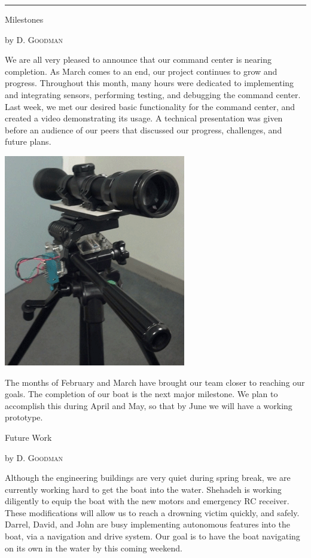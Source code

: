 \documentclass[10pt,a4paper]{article}
\newcommand{\SepRule}{\noindent							 %
						\begin{center}
							\rule{250pt}{1pt}
						\end{center}
						}
\newcommand{\NewsItem}[1]{%
		\usefont{T1}{augie}{m}{n} 	
		\large #1 \vspace{4pt}
		\par \normalsize \normalfont}
\newcommand{\NewsAuthor}[1]{%
			\hfill by \textsc{#1} \vspace{4pt}
			\par \normalfont}
\begin{document}
% 
\vspace{0.5cm}
	\SepRule
\vspace{0.5cm}
\begin{multicols}{3}
	\NewsItem{Milestones}
	\NewsAuthor{D. Goodman}
    
    We are all very pleased to announce that our command center is nearing completion. As March comes to an end, our project continues to grow and progress. Throughout this month, many hours were dedicated to implementing and integrating sensors, performing testing, and debugging the command center. Last week, we met our desired basic functionality for the command center, and created a video demonstrating its usage. A technical presentation was given before an audience of our peers that discussed our progress, challenges, and future plans.
\begin{center}
			\includegraphics[width=0.63\linewidth]{cc.png}
		\end{center}
The months of February and March have brought our team closer to reaching our goals. The completion of our boat is the next major milestone. We plan to accomplish this during April and May, so that by June we will have a working prototype. 
		

\vspace{1cm}
\NewsItem{Future Work}
\NewsAuthor{D. Goodman}
	Although the engineering buildings are very quiet during spring break, we are currently working hard to get the boat into the water. Shehadeh is working diligently to equip the boat with the new motors and emergency RC receiver. These modifications will allow us to reach a drowning victim quickly, and safely. Darrel, David, and John are busy implementing autonomous features into the boat, via a navigation and drive system. Our goal is to have the boat navigating on its own in the water by this coming weekend.


\end{multicols}
\end{document}
